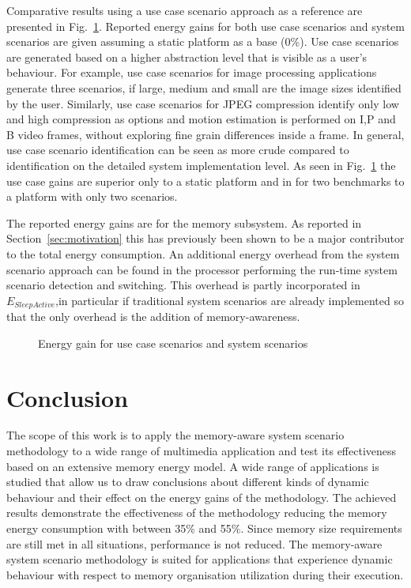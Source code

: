 \documentclass{acm_proc_article-sp}
\begin{document}
Comparative results using a use case scenario approach as a reference are presented in Fig.~\ref{fig:usecase}. Reported energy gains for both use case scenarios and system scenarios are given assuming a static platform as a base (0\%). Use case scenarios are generated based on a higher abstraction level that is visible as a user's behaviour. For example, use case scenarios for image processing applications generate three scenarios, if large, medium and small are the image sizes identified by the user. Similarly, use case scenarios for JPEG compression identify only low and high compression as options and motion estimation is performed on I,P and B video frames, without exploring fine grain differences inside a frame. In general, use case scenario identification can be seen as more crude compared to identification on the detailed system implementation level. As seen in Fig.~\ref{fig:usecase} the use case gains are superior only to a static platform and in for two benchmarks to a platform with only two scenarios.  

The reported energy gains are for the memory subsystem. As reported in Section~\ref{sec:motivation} this has previously been shown to be a major contributor to the total energy consumption. An additional energy overhead from the system scenario approach can be found in the processor performing the run-time system scenario detection and switching. This overhead is partly incorporated in $E_{SleepActive}$,in particular if traditional system scenarios are already implemented so that the only overhead is the addition of memory-awareness.

\begin{figure}[!t]
\centering
\caption{Energy gain for use case scenarios and system scenarios}
\label{fig:usecase}
\end{figure}

\section{Conclusion}
\label{sec:conclusion}

The scope of this work is to apply the memory-aware system scenario methodology to a wide range of multimedia application and test its effectiveness based on an extensive memory energy model. A wide range of applications is studied that allow us to draw conclusions about different kinds of dynamic behaviour and their effect on the energy gains of the methodology. The achieved results demonstrate the effectiveness of the methodology reducing the memory energy consumption with between 35\% and 55\%. Since memory size requirements are still met in all situations, performance is not reduced. The memory-aware system scenario methodology is suited for applications that experience dynamic behaviour with respect to memory organisation utilization during their execution.


%


\balancecolumns
\end{document}
